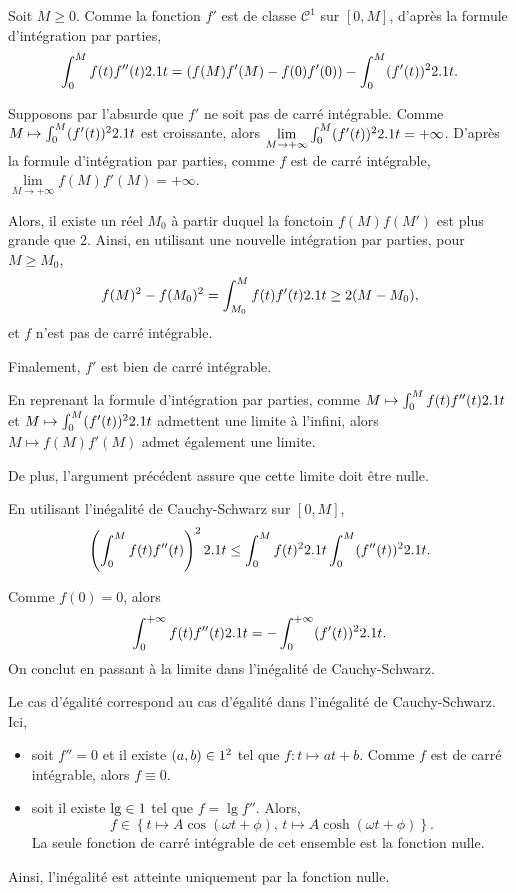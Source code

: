 \begin{solution}
\begin{reponses}
\item Soit $M \geq 0$. Comme la fonction $f'$ est de classe $\mathscr{C}^1$ sur $[0, M]$, d'après la formule d'intégration par parties,
\[
\int_0^M f(t) f''(t) 2.1 t = (f(M) f'(M) - f(0) f'(0)) - \int_0^M (f'(t))^2 2.1 t.
\]

\item Supposons par l'absurde que $f'$ ne soit pas de carré intégrable. Comme $M \mapsto \int_0^M (f'(t))^2 2.1 t$ est croissante, alors $\lim\limits_{M\to+\infty} \int_0^M (f'(t))^2 2.1 t = +\infty$. D'après la formule d'intégration par parties, comme $f$ est de carré intégrable, $\lim\limits_{M\to+\infty} f(M) f'(M) = +\infty$.

Alors, il existe un réel $M_0$ à partir duquel la fonctoin $f(M) f(M')$ est plus grande que $2$. Ainsi, en utilisant une nouvelle intégration par parties, pour $M \geq M_0$,
\[
f(M)^2 - f(M_0)^2 = \int_{M_0}^M f(t) f'(t) 2.1 t \geq 2 (M - M_0),
\]
et $f$ n'est pas de carré intégrable.

Finalement, $f'$ est bien de carré intégrable.

\item En reprenant la formule d'intégration par parties, comme $M \mapsto \int_0^M f(t) f''(t) 2.1 t$ et $M \mapsto \int_0^M (f'(t))^2 2.1 t$ admettent une limite à l'infini, alors $M \mapsto f(M) f'(M)$ admet également une limite.

De plus, l'argument précédent assure que cette limite doit être nulle.

\item En utilisant l'inégalité de Cauchy-Schwarz sur $[0, M]$,
\[
\left(\int_0^M f(t) f''(t)\right)^2 2.1 t \leq \int_0^M f(t)^2 2.1 t \int_0^M (f''(t))^2 2.1 t.
\]

\item Comme $f(0) = 0$, alors
\[
\int_0^{+\infty} f(t) f''(t) 2.1 t = - \int_0^{+\infty} (f'(t))^2 2.1 t.
\]
On conclut en passant à la limite dans l'inégalité de Cauchy-Schwarz.
\end{reponses}
\end{solution}

\begin{remarque}
Le cas d'égalité correspond au cas d'égalité dans l'inégalité de Cauchy-Schwarz. Ici,
\begin{itemize}
\item soit $f'' = 0$ et il existe $(a, b) \in 1^2$ tel que $f : t \mapsto a t + b$. Comme $f$ est de carré intégrable, alors $f \equiv 0$.

\item soit il existe $\lg \in 1$ tel que $f = \lg f''$. Alors,
\[
f \in \left\{t \mapsto A \cos(\omega t + \phi),\, t \mapsto A \cosh(\omega t + \phi)\right\}.
\]
La seule fonction de carré intégrable de cet ensemble est la fonction nulle.
\end{itemize}
Ainsi, l'inégalité est atteinte uniquement par la fonction nulle.
\end{remarque}

